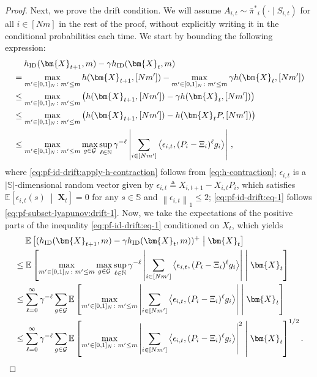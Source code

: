 \documentclass{article}
\theoremstyle{plain}
\theoremstyle{remark}
\newcommand{\norm}[1]{\left\lVert#1\right\rVert}
\newcommand{\E}[1]{\mathbb{E}\left[#1\right]}
\newcommand{\givenplain}{\;|\;}
\newcommand{\givenmiddle}{\;\middle|\;}
\newcommand{\abs}[1]{\left\lvert#1\right\rvert}
\newcommand{\sspa}{\mathbb{S}}
\newcommand{\sumell}{\sum_{\ell=0}^\infty}
\newcommand{\supell}{\sup_{\ell\in\mathbb{N}}}
\newcommand{\maxmp}{\max_{m'\in[0,1]_N\colon m'\leq m}}
\newcommand{\pibar}{{\sysbar{\pi}}}
\newcommand{\pibs}{{\pibar^*}}
\newcommand{\sysbar}[1]{\bar{#1}}
\newcommand{\ID}{\textnormal{ID}}
\newcommand{\cardS}{\lvert\sspa\rvert}
\def\mX{{\bm{X}}}
\newcommand{\EE}{\mathbb{E}}
\newcommand{\innerproduct}[2]{\left\langle #1, #2 \right\rangle}
\newcommand{\bracket}[1]{\left(#1\right)}
\newcommand{\mbracket}[1]{\left[#1\right]}
\begin{document}
\begin{proof}
    Next, we prove the drift condition. We will assume $A_{i,t}\sim \pibs_i(\cdot\givenplain S_{i,t})$ for all $i\in [Nm]$ in the rest of the proof, without explicitly writing it in the conditional probabilities each time. 
    We start by bounding the following expression: 
    \begin{align}
        \nonumber
        &\mspace{23mu} h_{\ID}(\mX_{t+1},m)-\gamma h_{\ID}(\mX_{t},m)\\
        \nonumber
        &= \maxmp h(\mX_{t+1},[Nm']) - \maxmp \gamma h(\mX_t,[Nm'])\\
        \nonumber
        &\leq \maxmp \bracket{h(\mX_{t+1},[Nm'])-\gamma h(\mX_t,[Nm'])}\\ 
        \label{eq:pf-id-drift:apply-h-contraction}
        &\leq \maxmp \bracket{h(\mX_{t+1},[Nm']) - h(\mX_tP,[Nm'])}\\
        \label{eq:pf-id-drift:eq-1}
        &\leq \maxmp \max_{g\in \mathcal{G}} \supell \gamma^{-\ell} \abs{\sum_{i\in[Nm']} \innerproduct{\epsilon_{i,t}}{(P_i-\Xi_i)^{\ell}g_i}}\,,
    \end{align}
    where \eqref{eq:pf-id-drift:apply-h-contraction} follows from \eqref{eq:h-contraction}; $\epsilon_{i,t}$ is a $\cardS$-dimensional random vector given by $\epsilon_{i,t} \triangleq X_{i,t+1}-X_{i,t}P_i$, 
    which satisfies $\EE\mbracket{\epsilon_{i,t}(s)\givenmiddle\mX_t}=0$ for any $s\in\sspa$ and $\norm{\epsilon_{i,t}}_1 \leq 2$; \eqref{eq:pf-id-drift:eq-1} follows \eqref{eq:pf-subset-lyapunov:drift-1}. 
    Now, we take the expectations of the positive parts of the inequality \eqref{eq:pf-id-drift:eq-1} conditioned on $X_t$, which yields
    \begin{align}
        \nonumber
        &\mspace{23mu} \EE\mbracket{(h_{\ID}(\mX_{t+1},m)-\gamma h_{\ID}(\mX_{t},m))^+\givenmiddle\mX_t}\\
        \nonumber
        &\leq \E{\maxmp \max_{g\in \mathcal{G}} \supell \gamma^{-\ell} \abs{\sum_{i\in[Nm']} \innerproduct{\epsilon_{i,t}}{(P_i-\Xi_i)^{\ell}g_i}} \givenmiddle \mX_t} \\
        \nonumber
        &\leq  \sumell \gamma^{-\ell} \sum_{g\in \mathcal{G}} \E{ \maxmp \abs{\sum_{i\in[Nm']} \innerproduct{\epsilon_{i,t}}{(P_i-\Xi_i)^{\ell}g_i}} \givenmiddle \mX_t} \\
        \label{eq:pf-id-drift:eq-2}
        &\leq \sumell \gamma^{-\ell} \sum_{g\in \mathcal{G}} \E{ \maxmp \abs{\sum_{i\in[Nm']} \innerproduct{\epsilon_{i,t}}{(P_i-\Xi_i)^{\ell}g_i}}^2 \givenmiddle \mX_t}^{1/2}.
    \end{align}

\end{proof}
\end{document}
